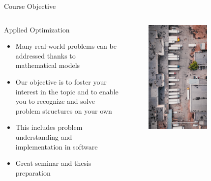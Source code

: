 \documentclass[aspectratio=1610,12pt]{beamer}
\begin{document}
\begin{frame}[fragile]{Course Objective}
    \label{pic_bandura}
	\begin{columns}[onlytextwidth]
		\center
    		\begin{block}{Applied Optimization}
				\begin{itemize}
					\item Many real-world problems can be addressed thanks to mathematical models
					\item Our objective is to foster your interest in the topic and to enable you to recognize and solve problem structures on your own
					\item This includes problem understanding and implementation in software
					\item Great seminar and thesis preparation
	    			\end{itemize}
    		\end{block}
    	\center
    		\begin{figure}
    			\includegraphics[width=0.7\textwidth]{images/ivan-bandura-N_FDXbXwQmc-unsplash.jpg}
    		\end{figure}
    \end{columns}
\end{frame}
\end{document}
